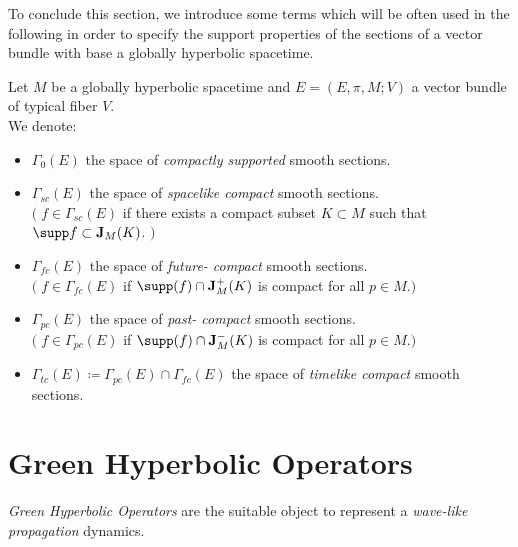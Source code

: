 \documentclass[Main]{subfiles}
\begin{document}
			To conclude this section, we introduce some terms which will be often used in the following in order to
specify the support properties of the sections of a vector bundle with base a globally hyperbolic spacetime.
			\begin{notationfix}
			
				Let $M$ be a globally hyperbolic spacetime and $E=(E,\pi,M;V)$ a vector bundle of typical fiber $V$.\\
				We denote:
				\begin{itemize}
							\renewcommand\labelitemi{$\cdot$}
					\item $\Gamma_0(E)$ the space of \emph{compactly supported} smooth sections.
					\item $\Gamma_{sc}(E)$  the space of \emph{spacelike compact} smooth sections.\\
						$\big(\; f\in \Gamma_{sc}(E)$ if there exists a compact subset $K \subset M$  such that $\supp f \subset \mathbf{J}_M(K)$. $\big)$
					\item  $\Gamma_{fc}(E) $ the space of \emph{future- compact} smooth sections.\\
						$\big(\; f\in \Gamma_{fc}(E) $ if  $\supp(f) \cap  \mathbf{J}^+_M(K)$ is compact for all $p\in M$.$\big)$
					\item  $\Gamma_{pc}(E) $ the space of \emph{past- compact} smooth sections.\\
						$\big(\; f\in \Gamma_{pc}(E) $ if  $\supp(f) \cap  \mathbf{J}^-_M(K)$ is compact for all $p\in M$.$\big)$
					\item $\Gamma_{tc}(E) \coloneqq \Gamma_{pc}(E) \cap \Gamma_{fc}(E) $ the space of \emph{timelike compact} smooth sections.
				\end{itemize}
			\end{notationfix}				
			

		

		\section{Green Hyperbolic Operators}
					\emph{Green Hyperbolic Operators} are the suitable object to represent a \emph{wave-like propagation} dynamics.
					
\end{document}
